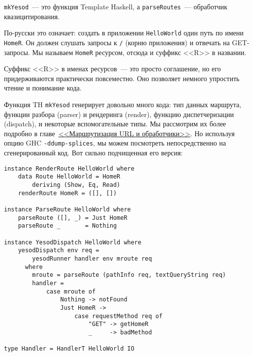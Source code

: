 \begin{remark}
    \lstinline!mkYesod!~--- это функция Template Haskell, а
    \lstinline!parseRoutes!~--- обработчик квазицитирования.
\end{remark}

По-русски это означает: создать в приложении \texttt{HelloWorld} один путь по
имени \lstinline!HomeR!. Он должен слушать запросы к \texttt{/} (корню
приложения) и отвечать на GET-запросы. Мы называем \lstinline!HomeR! ресурсом,
отсюда и суффикс <<R>> в названии.

\begin{remark}
  Суффикс <<R>> в именах ресурсов~--- это просто соглашение, но его
  придерживаются практически повсеместно. Оно позволяет немного упростить
  чтение и понимание кода.
\end{remark}

Функция TH \lstinline!mkYesod! генерирует довольно много кода: тип данных
маршрута, функции разбора (parser) и рендеринга (render), функцию
диспетчеризации (dispatch), и некоторые вспомогательные типы. Мы рассмотрим их
более подробно в главе~\hyperref[chap:routing]{<<Маршрутизация URL и
    обработчики>>}. Но используя опцию GHC \lstinline'-ddump-splices', мы можем
посмотреть непосредственно на сгенерированный код. Вот сильно подчищенная его
версия:

\begin{lstlisting}
instance RenderRoute HelloWorld where
    data Route HelloWorld = HomeR
        deriving (Show, Eq, Read)
    renderRoute HomeR = ([], [])

instance ParseRoute HelloWorld where
    parseRoute ([], _) = Just HomeR
    parseRoute _       = Nothing

instance YesodDispatch HelloWorld where
    yesodDispatch env req =
        yesodRunner handler env mroute req
      where
        mroute = parseRoute (pathInfo req, textQueryString req)
        handler =
            case mroute of
                Nothing -> notFound
                Just HomeR ->
                    case requestMethod req of
                        "GET" -> getHomeR
                        _     -> badMethod

type Handler = HandlerT HelloWorld IO
\end{lstlisting}

